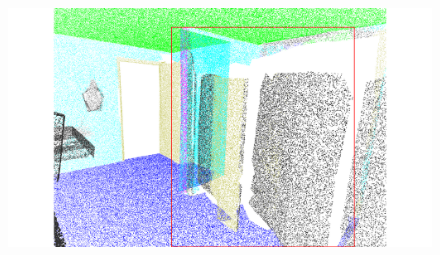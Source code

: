 \begin{figure}[htbp]
\begin{minipage}{0.22\textwidth}
    \end{minipage}
    \hfill
    \begin{minipage}{0.22\textwidth}
        \centering
        \includegraphics[width=\textwidth]{fig/supplement/semantic_segmentation/wc_2/Full_wc_2.pdf}
    \end{minipage}
    \hfill

    \vspace{0.5em}


\end{figure}
